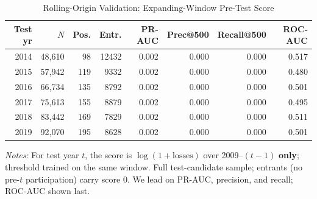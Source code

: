 \begin{table}[htbp]\centering
\caption{Rolling-Origin Validation: Expanding-Window Pre-Test Score}
\label{tab:rolling_origin}
\footnotesize
\begin{tabular}{rrrrrrrr}
\toprule
Test yr & $N$ & Pos. & Entr. & PR-AUC & Prec@500 & Recall@500 & ROC-AUC \\
\midrule
2014 & 48,610 & 98 & 12432 & 0.002 & 0.000 & 0.000 & 0.517 \\
2015 & 57,942 & 119 & 9332 & 0.002 & 0.000 & 0.000 & 0.480 \\
2016 & 66,734 & 135 & 8792 & 0.002 & 0.000 & 0.000 & 0.501 \\
2017 & 75,613 & 155 & 8879 & 0.002 & 0.000 & 0.000 & 0.495 \\
2018 & 83,442 & 169 & 7829 & 0.002 & 0.000 & 0.000 & 0.511 \\
2019 & 92,070 & 195 & 8628 & 0.002 & 0.000 & 0.000 & 0.501 \\
\bottomrule
\end{tabular}
\begin{minipage}{\linewidth}\vspace{2pt}\footnotesize
\textit{Notes:} For test year $t$, the score is $\log(1+\text{losses})$ over 2009--$(t{-}1)$ \textbf{only}; threshold trained on the same window. Full test-candidate sample; entrants (no pre-$t$ participation) carry score 0. We lead on PR-AUC, precision, and recall; ROC-AUC shown last.
\end{minipage}
\end{table}
